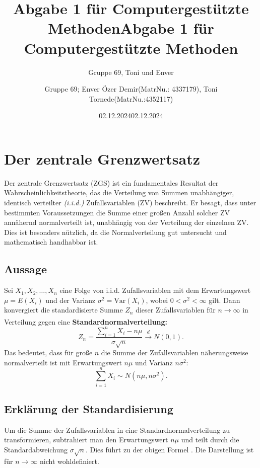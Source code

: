 \documentclass{article}
\title{Abgabe 1 für Computergestützte Methoden}
\author{Gruppe 69, Toni und Enver }
\date{02.12.2024}
\title{Abgabe 1 für Computergestützte Methoden}
\author{Gruppe 69; Enver Özer Demir(MatrNu.: 4337179),
Toni Tornede(MatrNu.:4352117)}
\date{02.12.2024}
\newcommand{\redboxlink}[2]{\textsuperscript{\hyperlink{#1}{\fbox{\textcolor{red}{#2}}}}}
\begin{document}
\maketitle
\tableofcontents
\newpage


\section{Der zentrale Grenzwertsatz}
\label{sec:zgs}

Der zentrale Grenzwertsatz (ZGS) ist ein fundamentales Resultat der Wahrscheinlichkeitstheorie, das die Verteilung von Summen unabhängiger, identisch verteilter \textit{(i.i.d.)} Zufallsvariablen (ZV) beschreibt. Er besagt, dass unter bestimmten Voraussetzungen die Summe einer großen Anzahl solcher ZV annähernd normalverteilt ist, unabhängig von der Verteilung der einzelnen ZV. Dies ist besonders nützlich, da die Normalverteilung gut untersucht und mathematisch handhabbar ist.

\subsection{Aussage}
Sei $X_1, X_2, \dots, X_n$ eine Folge von i.i.d. Zufallsvariablen mit dem Erwartungswert $\mu = E(X_i)$ und der Varianz $\sigma^2 = \text{Var}(X_i)$, wobei $0 < \sigma^2 < \infty$ gilt. Dann konvergiert die standardisierte Summe $Z_n$ dieser Zufallsvariablen für $n \to \infty$ in Verteilung gegen eine \textbf{Standardnormalverteilung:}\redboxlink{zgs1}{1} 
\begin{equation}
Z_n = \frac{\sum_{i=1}^n X_i - n\mu}{\sigma \sqrt{n}} \overset{d}{\to} N(0,1). \tag{1}
\end{equation}
Das bedeutet, dass für große $n$ die Summe der Zufallsvariablen näherungsweise normalverteilt ist mit Erwartungswert $n\mu$ und Varianz $n\sigma^2$:
\begin{equation}
\sum_{i=1}^n X_i \sim N(n\mu, n\sigma^2). \tag{2}
\end{equation}

\subsection{Erklärung der Standardisierung}
\label{zgs1}
Um die Summe der Zufallsvariablen in eine Standardnormalverteilung zu transformieren, subtrahiert man den Erwartungswert $n\mu$ und teilt durch die Standardabweichung $\sigma \sqrt{n}$. Dies führt zu der obigen Formel \hyperlink{zgs1}{\fbox{\textcolor{red}{(1)}}}. Die Darstellung \hyperlink{zgs2}{\fbox{\textcolor{red}{(2)}}} ist für $n \to \infty$ nicht wohldefiniert.
\end{document}
